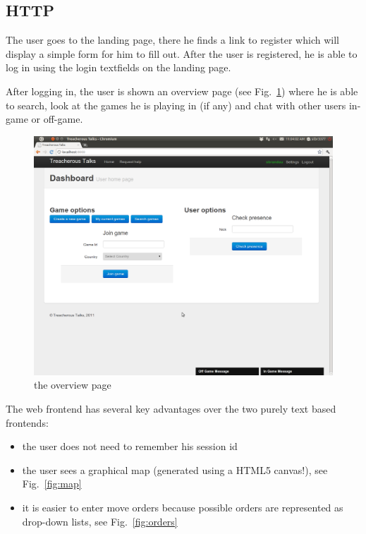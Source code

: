 \documentclass[11pt,a4paper]{report}
\begin{document}
\subsection{HTTP}
The user goes to the landing page, there he finds a link to register which will
display a simple form for him to fill out. After the user is registered, he is
able to log in using the login textfields on the landing page.

After logging in, the user is shown an overview page (see Fig.~\ref{fig:overview})
 where he is able to search, look at the games he is playing in (if any) and chat
with other users in-game or off-game.

\begin{figure}[h]
 \centering
 \includegraphics[width=\textwidth]{./graphics/overviewpage.png}
 \caption{the overview page}
 \label{fig:overview}
\end{figure}

The web frontend has several key advantages over the two purely text based
frontends:\\
\begin{itemize}
\item the user does not need to remember his session id
\item the user sees a graphical map (generated using a HTML5 canvas!),
  see Fig.~\ref{fig:map}
\item it is easier to enter move orders because possible orders are represented
  as drop-down lists, see Fig.~\ref{fig:orders}
\end{itemize}
\end{document}
